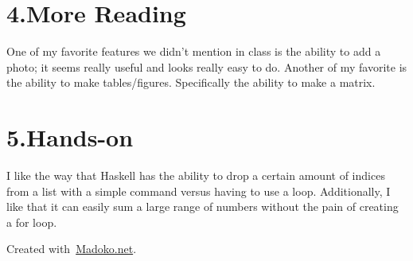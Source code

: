 \documentclass[11pt]{article}
\begin{document}
\section{4.\hspace*{0.5em}More Reading}\label{sec-more-reading}%

\noindent{}One of my favorite features we didn't mention in class is the ability to add a photo; it seems really useful and looks really easy to do.
Another of my favorite is the ability to make tables/figures. Specifically the ability to make a matrix.%

\section{5.\hspace*{0.5em}Hands-on}\label{sec-hands-on}%

\noindent{}I like the way that Haskell has the ability to drop a certain amount of indices from a list with a simple command versus having to use a loop. Additionally, I like that it can easily sum a large range of numbers without the pain of creating a for loop.%

\begin{mdbmargintb}{4em}{}%
\begin{mdflushright}%
{\tiny{}Created with~\href{https://www.madoko.net}{Madoko.net}.}%
\end{mdflushright}%
\end{mdbmargintb}%
\end{document}
